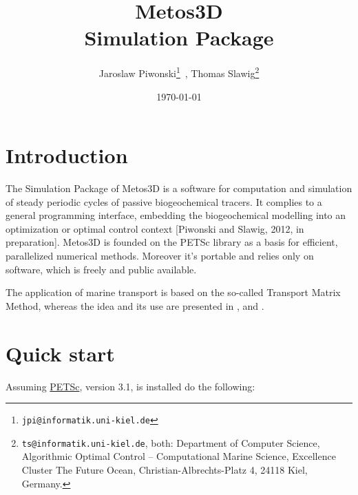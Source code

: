 \documentclass{article}
\begin{document}
%
%
\title{
Metos3D\\
\bigskip
Simulation Package
}
\author{
Jaroslaw Piwonski\thanks{\texttt{jpi@informatik.uni-kiel.de}} \,,
Thomas Slawig\thanks{\texttt{ts@informatik.uni-kiel.de},
both: Department of Computer Science, Algorithmic Optimal Control -- Computational Marine Science,
Excellence Cluster The Future Ocean, Christian-Albrechts-Platz 4, 24118 Kiel, Germany.}
}
\date{\today}
\maketitle

%
%
\newpage
\section{Introduction}

The Simulation Package of Metos3D is a software for computation and simulation of
steady periodic cycles of passive biogeochemical tracers. It complies to a general
programming interface, embedding the biogeochemical modelling into an
optimization or optimal control context [Piwonski and Slawig, 2012, in preparation].
Metos3D is founded on the PETSc library \cite{PETSc} as a basis for efficient,
parallelized numerical methods. Moreover it's portable and relies only on software,
which is freely and public available.

The application of marine transport is based on the so-called Transport Matrix Method,
whereas the idea and its use are presented in \cite{KhViCa05}, \cite{Kha07} and \cite{Kha08}.

%
%
\section{Quick start}

Assuming \href{http://www.mcs.anl.gov/petsc/}{PETSc}, version 3.1,
is installed do the following:
\end{document}
